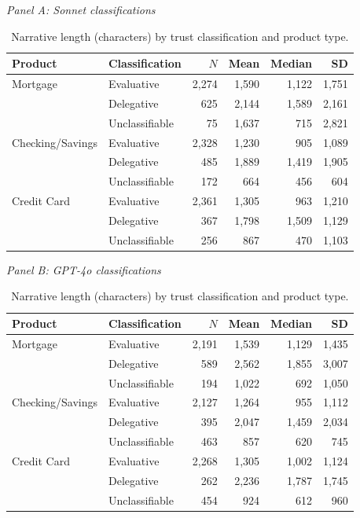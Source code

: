 \begin{table}[H]
\centering
\caption{Narrative length (characters) by trust classification and product type.}
\label{tab:supp_length}
\begin{small}\centering
\textit{Panel A: Sonnet classifications}

\medskip
\begin{tabular}{llrrrr}
\toprule
Product & Classification & $N$ & Mean & Median & SD \\
\midrule
Mortgage          & Evaluative      & 2,274 & 1,590 & 1,122 & 1,751 \\
                  & Delegative      &   625 & 2,144 & 1,589 & 2,161 \\
                  & Unclassifiable  &    75 & 1,637 &   715 & 2,821 \\
Checking/Savings  & Evaluative      & 2,328 & 1,230 &   905 & 1,089 \\
                  & Delegative      &   485 & 1,889 & 1,419 & 1,905 \\
                  & Unclassifiable  &   172 &   664 &   456 &   604 \\
Credit Card       & Evaluative      & 2,361 & 1,305 &   963 & 1,210 \\
                  & Delegative      &   367 & 1,798 & 1,509 & 1,129 \\
                  & Unclassifiable  &   256 &   867 &   470 & 1,103 \\
\bottomrule
\end{tabular}

\bigskip
\textit{Panel B: GPT-4o classifications}

\medskip
\begin{tabular}{llrrrr}
\toprule
Product & Classification & $N$ & Mean & Median & SD \\
\midrule
Mortgage          & Evaluative      & 2,191 & 1,539 & 1,129 & 1,435 \\
                  & Delegative      &   589 & 2,562 & 1,855 & 3,007 \\
                  & Unclassifiable  &   194 & 1,022 &   692 & 1,050 \\
Checking/Savings  & Evaluative      & 2,127 & 1,264 &   955 & 1,112 \\
                  & Delegative      &   395 & 2,047 & 1,459 & 2,034 \\
                  & Unclassifiable  &   463 &   857 &   620 &   745 \\
Credit Card       & Evaluative      & 2,268 & 1,305 & 1,002 & 1,124 \\
                  & Delegative      &   262 & 2,236 & 1,787 & 1,745 \\
                  & Unclassifiable  &   454 &   924 &   612 &   960 \\
\bottomrule
\end{tabular}
\end{small}
\end{table}

